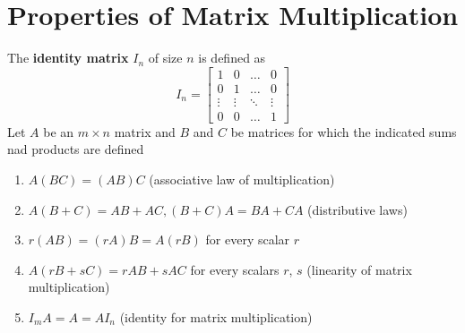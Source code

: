 \section{Properties of Matrix Multiplication}
The \textbf{identity matrix} $I_n$ of size $n$ is defined as
\[
  I_n = \begin{bmatrix}
    1 & 0 & \dots & 0 \\
    0 & 1 & \dots & 0 \\
    \vdots & \vdots & \ddots & \vdots \\
    0 & 0 & \dots & 1
  \end{bmatrix}
\]
Let $A$ be an $m \times n$ matrix and $B$ and $C$ be matrices for which the 
indicated sums nad products are defined 
\begin{enumerate}
  \item $A(BC) = (AB)C$ (associative law of multiplication)
  \item $A(B + C) = AB + AC, (B + C)A = BA + CA$ (distributive laws)
  \item $r(AB) = (rA)B = A(rB)$ for every scalar $r$
  \item $A(rB + sC) = rAB + sAC$ for every scalars $r$, $s$ (linearity of matrix 
    multiplication)
  \item $I_mA = A = AI_n$ (identity for matrix multiplication)
\end{enumerate}
